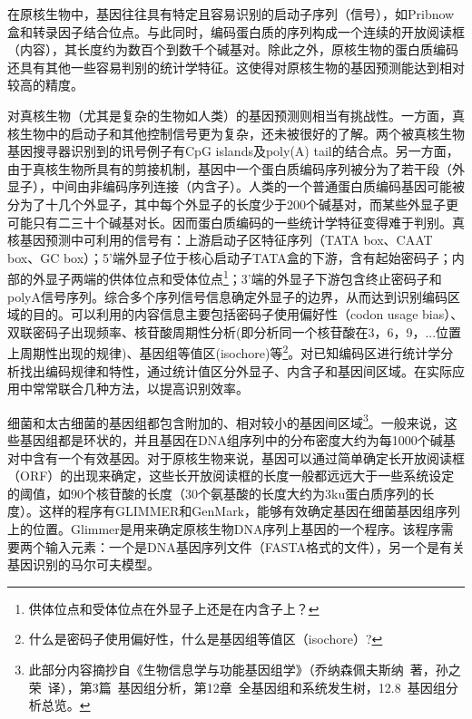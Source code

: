 \documentclass[11pt,a4paper,twoside]{book}
\begin{document}
在原核生物中，基因往往具有特定且容易识别的启动子序列（信号），如Pribnow盒和转录因子结合位点。与此同时，编码蛋白质的序列构成一个连续的开放阅读框（内容），其长度约为数百个到数千个碱基对。除此之外，原核生物的蛋白质编码还具有其他一些容易判别的统计学特征。这使得对原核生物的基因预测能达到相对较高的精度。

对真核生物（尤其是复杂的生物如人类）的基因预测则相当有挑战性。一方面，真核生物中的启动子和其他控制信号更为复杂，还未被很好的了解。两个被真核生物基因搜寻器识别到的讯号例子有CpG islands及poly(A) tail的结合点。另一方面，由于真核生物所具有的剪接机制，基因中一个蛋白质编码序列被分为了若干段（外显子），中间由非编码序列连接（内含子）。人类的一个普通蛋白质编码基因可能被分为了十几个外显子，其中每个外显子的长度少于200个碱基对，而某些外显子更可能只有二三十个碱基对长。因而蛋白质编码的一些统计学特征变得难于判别。真核基因预测中可利用的信号有：上游启动子区特征序列（TATA box、CAAT box、GC box）；5'端外显子位于核心启动子TATA盒的下游，含有起始密码子；内部的外显子两端的供体位点和受体位点\footnote{供体位点和受体位点在外显子上还是在内含子上？}；3'端的外显子下游包含终止密码子和polyA信号序列。综合多个序列信号信息确定外显子的边界，从而达到识别编码区域的目的。可以利用的内容信息主要包括密码子使用偏好性（codon usage bias）、双联密码子出现频率、核苷酸周期性分析(即分析同一个核苷酸在3，6，9，...位置上周期性出现的规律)、基因组等值区(isochore)等\footnote{什么是密码子使用偏好性，什么是基因组等值区（isochore）?}。对已知编码区进行统计学分析找出编码规律和特性，通过统计值区分外显子、内含子和基因间区域。在实际应用中常常联合几种方法，以提高识别效率。

细菌和太古细菌的基因组都包含附加的、相对较小的基因间区域\footnote{此部分内容摘抄自《生物信息学与功能基因组学》（乔纳森\textbullet 佩夫斯纳\ 著，孙之荣\ 译），第3篇\ 基因组分析，第12章\ 全基因组和系统发生树，12.8\ 基因组分析总览。}。一般来说，这些基因组都是环状的，并且基因在DNA组序列中的分布密度大约为每1000个碱基对中含有一个有效基因。对于原核生物来说，基因可以通过简单确定长开放阅读框（ORF）的出现来确定，这些长开放阅读框的长度一般都远远大于一些系统设定的阈值，如90个核苷酸的长度（30个氨基酸的长度大约为3ku蛋白质序列的长度）。这样的程序有GLIMMER和GenMark，能够有效确定基因在细菌基因组序列上的位置。Glimmer是用来确定原核生物DNA序列上基因的一个程序。该程序需要两个输入元素：一个是DNA基因序列文件（FASTA格式的文件），另一个是有关基因识别的马尔可夫模型。
\end{document}
